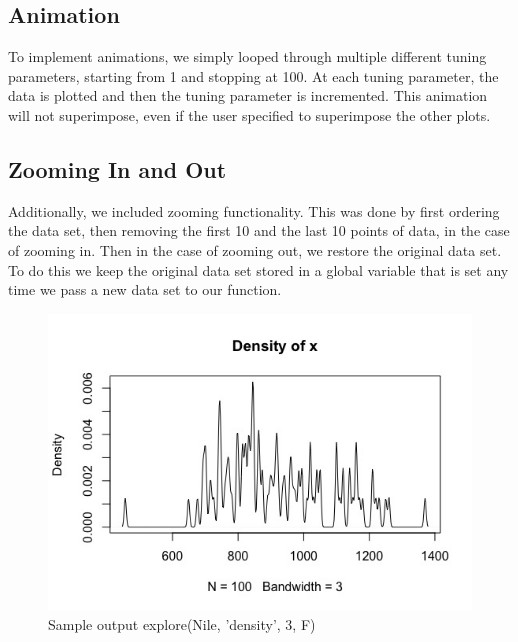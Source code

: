 \documentclass{article}
\begin{document}
\subsection{Animation}
To implement animations, we simply looped through multiple different tuning parameters, starting from 1 and stopping at 100. At each tuning parameter, the data is plotted and then the tuning parameter is incremented. This animation will not superimpose, even if the user specified to superimpose the other plots.

\subsection{Zooming In and Out}
Additionally, we included zooming functionality. This was done by first ordering the data set, then removing the first 10 and the last 10 points of data, in the case of zooming in. Then in the case of zooming out, we restore the original data set. To do this we keep the original data set stored in a global variable that is set any time we pass a new data set to our function.

\begin{figure}[H]
\centering
\includegraphics[scale=0.5]{Nile, 3 density before zoom.jpeg}
\caption{Sample output explore(Nile, 'density', 3, F) }
\label{fig:Nile density graph 3}
\end{figure}
\end{document}
